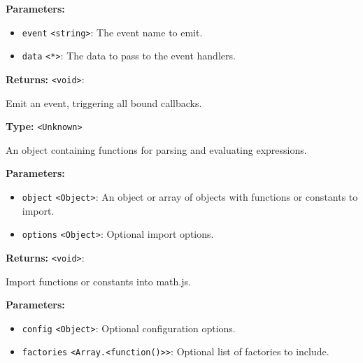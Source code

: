 \documentclass[12pt,a4paper]{article}
\begin{document}
\vspace{5mm}
\noindent {}


\noindent \textbf{Parameters:}
\begin{itemize}
  \item \texttt{event} \texttt{<string>}: The event name to emit.
  \item \texttt{data} \texttt{<*>}: The data to pass to the event handlers.
\end{itemize}

\noindent \textbf{Returns:} \texttt{<void>}:

\noindent Emit an event, triggering all bound callbacks.

\vspace{5mm}
\noindent {}\vspace{4mm}


\noindent \textbf{Type:} \texttt{<Unknown>}

\noindent An object containing functions for parsing and evaluating expressions.

\vspace{5mm}
\noindent {}


\noindent \textbf{Parameters:}
\begin{itemize}
  \item \texttt{object} \texttt{<Object>}: An object or array of objects with functions or constants to import.
  \item \texttt{options} \texttt{<Object>}: Optional import options.
\end{itemize}

\noindent \textbf{Returns:} \texttt{<void>}:

\noindent Import functions or constants into math.js.

\vspace{5mm}
\noindent {}


\noindent \textbf{Parameters:}
\begin{itemize}
  \item \texttt{config} \texttt{<Object>}: Optional configuration options.
  \item \texttt{factories} \texttt{<Array.<function()>>}: Optional list of factories to include.
\end{itemize}
\end{document}
